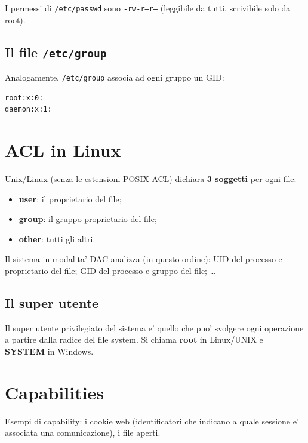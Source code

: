 I permessi di \texttt{/etc/passwd} sono \texttt{-rw-r--r--} (leggibile da tutti, scrivibile solo da root).

\subsection{Il file \texttt{/etc/group}}
Analogamente, \texttt{/etc/group} associa ad ogni gruppo un GID:
\begin{verbatim}
root:x:0:
daemon:x:1:
\end{verbatim}

\section{ACL in Linux}
Unix/Linux (senza le estensioni POSIX ACL) dichiara \textbf{3 soggetti} per ogni file:
\begin{itemize}
  \item \textbf{user}: il proprietario del file;
  \item \textbf{group}: il gruppo proprietario del file;
  \item \textbf{other}: tutti gli altri.
\end{itemize}

Il sistema in modalita' DAC analizza (in questo ordine): UID del processo e proprietario del file; GID del processo e gruppo del file; \dots
{}

\subsection{Il super utente}
Il super utente privilegiato del sistema e' quello che puo' svolgere ogni operazione a partire dalla radice del file system. Si chiama \textbf{root} in Linux/UNIX e \textbf{SYSTEM} in Windows.

\section{Capabilities}
Esempi di capability: i cookie web (identificatori che indicano a quale sessione e' associata una comunicazione), i file aperti.

